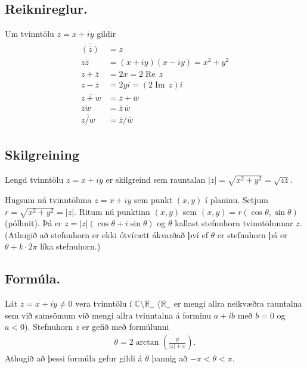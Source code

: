 \documentclass[a4paper,10pt,icelandic]{sphinxmanual}
\begin{document}
\subsection{Reiknireglur.}
\label{\detokenize{Kafli01:reiknireglur}}
Um tvinntölu \(z=x+iy\) gildir
\begin{equation*}
\begin{split}\begin{aligned}
\overline{(\overline{z})}&=z\\
z\overline{z}&=(x+iy)(x-iy)=x^2+y^2\\
z+\overline z&=2x=2\operatorname{Re\, } z\\
z-\overline z&=2yi=(2\operatorname{Im\, } z)i\\
\overline{z+w}&=\overline{z}+\overline{w}\\
\overline{zw}&=\overline{z}\,\overline{w}\\
\overline{z/w}&=\overline{z}/\overline{w}\end{aligned}\end{split}
\end{equation*}

\subsection{Skilgreining}
\label{\detokenize{Kafli01:id4}}
Lengd tvinntölu \(z=x+iy\) er skilgreind sem
rauntalan \(|z|=\sqrt{x^2+y^2}=\sqrt{z\overline{z}}\).

Hugsum nú tvinntöluna \(z=x+iy\) sem punkt \((x,y)\) í planinu.
Setjum \(r=\sqrt{x^2+y^2}=|z|\). Ritum nú punktinn \((x,y)\) sem
\((x,y)=r(\cos \theta, \sin\theta)\) (pólhnit). Þá er
\(z=|z|(\cos\theta+i\sin\theta)\) og \(\theta\) kallast
stefnuhorn tvinntölunnar \(z\). (Athugið að stefnuhorn er ekki
ótvírætt ákvarðað því ef \(\theta\) er stefnuhorn þá er
\(\theta+k\cdot 2\pi\) líka stefnuhorn.)


\subsection{Formúla.}
\label{\detokenize{Kafli01:formula}}
Lát \(z=x+iy\neq 0\) vera tvinntölu í
\({\mathbb{C}}\setminus \mathbb{R}_-\) (\(\mathbb{R}_-\) er mengi allra neikvæðra
rauntalna sem við samsömum við mengi allra tvinntalna á forminu
\(a+ib\) með \(b=0\) og \(a<0\)). Stefnuhorn \(z\) er
gefið með formúlunni
\begin{equation*}
\begin{split}\theta=2\arctan\left(\tfrac{y}{|z|+x}\right).\end{split}
\end{equation*}
Athugið að þessi formúla gefur gildi á \(\theta\) þannig að
\(-\pi<\theta<\pi\).
\end{document}
